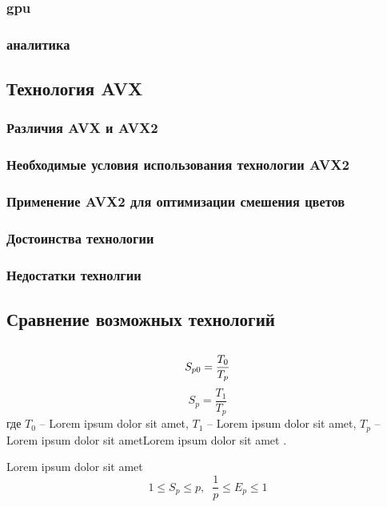 \subsubsection{gpu}
\subsubsection{аналитика}
\subsection{Технология AVX}
\subsubsection{Различия AVX и AVX2}
\subsubsection{Необходимые условия использования технологии AVX2}
\subsubsection{Применение AVX2 для оптимизации смешения цветов}
\subsubsection{Достоинства технологии}
\subsubsection{Недостатки технолгии}
\subsection{Сравнение возможных технологий}
\subsection{}



\begin{equation}
S_{p0}=\frac{T_{0} }{T_{p}} \\
\label{F:100}
\end{equation}
\begin{equation}
S_{p}=\frac{T_{1} }{T_{p}}
\label{F:101}
\end{equation}
где $T_{0}$ -- Lorem ipsum dolor sit amet, $T_{1}$ -- Lorem ipsum dolor sit amet, $T_{p}$ -- Lorem ipsum dolor sit ametLorem ipsum dolor sit amet . 

Lorem ipsum dolor sit amet
\begin{equation}
1\leq S_{p} \leq p,\; \;  \frac{1}{p} \leq E_{p} \leq 1
\label{F:103}
\end{equation}



